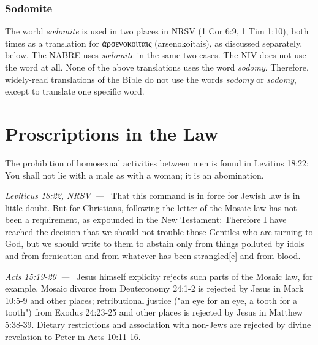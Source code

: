 \documentclass[10pt]{article}
\let\oldquote\quote
\let\endoldquote\endquote
\renewenvironment{quote}[2][]
  {\if\relax\detokenize{#1}\relax
     \def\quoteauthor{#2}%
   \else
     \def\quoteauthor{#2~---~#1}%
   \fi
   \oldquote}
  {\par\nobreak\smallskip\hfill\textit{\quoteauthor}%
   \endoldquote\addvspace{\bigskipamount}}
\begin{document}
\subsubsection*{Sodomite}

\indent The world \textit{sodomite} is used in two places in NRSV (1 Cor 6:9, 1 Tim 1:10), both times as a translation for {\textgreekfont ἀρσενοκοίταις} (arsenokoitais), as discussed separately, below. The NABRE uses \textit{sodomite} in the same two cases. The NIV does not use the word at all. None of the above translations uses the word \textit{sodomy}. Therefore, widely-read translations of the Bible do not use the words \textit{sodomy} or \textit{sodomy}, except to translate one specific word.

\section*{Proscriptions in the Law}

The prohibition of homosexual activities between men is found in Levitius 18:22:
\begin{quote}{Leviticus 18:22, NRSV}
You shall not lie with a male as with a woman; it is an abomination. 
\end{quote}
That this command is in force for Jewish law is in little doubt. But for Christians, following the letter of the Mosaic law has not been a requirement, as expounded in the New Testament:
\begin{quote}{Acts 15:19-20}
Therefore I have reached the decision that we should not trouble those Gentiles who are turning to God, but we should write to them to abstain only from things polluted by idols and from fornication and from whatever has been strangled[e] and from blood.
\end{quote}
Jesus himself explicity rejects such parts of the Mosaic law, for example, Mosaic divorce from Deuteronomy 24:1-2 is rejected by Jesus in Mark 10:5-9 and other places; retributional justice ("an eye for an eye, a tooth for a tooth") from Exodus 24:23-25 and other places is rejected by Jesus in Matthew 5:38-39. Dietary restrictions and association with non-Jews are rejected by divine revelation to Peter in Acts 10:11-16. 
\end{document}
